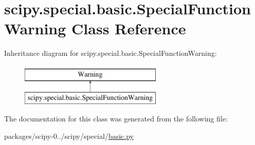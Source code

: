 \hypertarget{classscipy_1_1special_1_1basic_1_1SpecialFunctionWarning}{}\section{scipy.\+special.\+basic.\+Special\+Function\+Warning Class Reference}
\label{classscipy_1_1special_1_1basic_1_1SpecialFunctionWarning}
Inheritance diagram for scipy.\+special.\+basic.\+Special\+Function\+Warning\+:\begin{figure}[H]
\begin{center}
\leavevmode
\includegraphics[height=2.000000cm]{classscipy_1_1special_1_1basic_1_1SpecialFunctionWarning}
\end{center}
\end{figure}


The documentation for this class was generated from the following file\+:\begin{DoxyCompactItemize}
\item 
packages/scipy-\/0../scipy/special/\hyperlink{special_2basic_8py}{basic.\+py}\end{DoxyCompactItemize}
